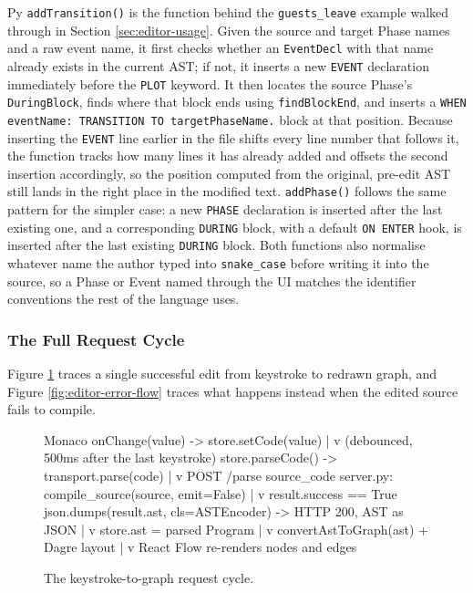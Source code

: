 \begin{codeblock}[]{Py}
\lstinline|addTransition()| is the function behind the \lstinline|guests_leave| example walked through in Section \ref{sec:editor-usage}. Given the source and target Phase names and a raw event name, it first checks whether an \lstinline|EventDecl| with that name already exists in the current AST; if not, it inserts a new \lstinline|EVENT| declaration immediately before the \lstinline|PLOT| keyword. It then locates the source Phase's \lstinline|DuringBlock|, finds where that block ends using \lstinline|findBlockEnd|, and inserts a \lstinline|WHEN eventName: TRANSITION TO targetPhaseName.| block at that position. Because inserting the \lstinline|EVENT| line earlier in the file shifts every line number that follows it, the function tracks how many lines it has already added and offsets the second insertion accordingly, so the position computed from the original, pre-edit AST still lands in the right place in the modified text. \lstinline|addPhase()| follows the same pattern for the simpler case: a new \lstinline|PHASE| declaration is inserted after the last existing one, and a corresponding \lstinline|DURING| block, with a default \lstinline|ON ENTER| hook, is inserted after the last existing \lstinline|DURING| block. Both functions also normalise whatever name the author typed into \lstinline|snake_case| before writing it into the source, so a Phase or Event named through the UI matches the identifier conventions the rest of the language uses.

\subsubsection{The Full Request Cycle}
Figure \ref{fig:editor-keystroke-flow} traces a single successful edit from keystroke to redrawn graph, and Figure \ref{fig:editor-error-flow} traces what happens instead when the edited source fails to compile.

\begin{figure}[h]
    \centering
    \begin{codeblock}[]{}
Monaco onChange(value)  ->  store.setCode(value)
        |
        v (debounced, 500ms after the last keystroke)
store.parseCode()  ->  transport.parse(code)
        |
        v  POST /parse { source_code }
server.py: compile_source(source, emit=False)
        |
        v  result.success == True
json.dumps(result.ast, cls=ASTEncoder)  ->  HTTP 200, AST as JSON
        |
        v
store.ast = parsed Program
        |
        v
convertAstToGraph(ast)  +  Dagre layout
        |
        v
React Flow re-renders nodes and edges
    \end{codeblock}
    \caption{The keystroke-to-graph request cycle.}
    \label{fig:editor-keystroke-flow}
\end{figure}


\end{codeblock}

